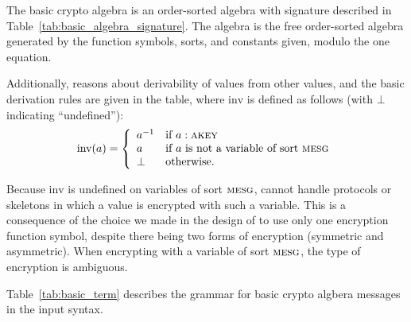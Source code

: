 The basic crypto algebra is an order-sorted algebra with signature
described in Table~\ref{tab:basic_algebra_signature}.  The algebra is
the free order-sorted algebra generated by the function symbols,
sorts, and constants given, modulo the one equation.

Additionally, {\cpsa} reasons about derivability of values from other
values, and the basic derivation rules are given in the table, where
$\mathrm{inv}$ is defined as follows (with $\bot$ indicating
``undefined''):
\begin{equation}
%
\mathrm{inv}(a) = \left\{
%
\begin{array}{ll}
%
a^{-1} & \mbox{if $a : \scap{akey}$}\\
%
a & \mbox{if $a$ is not a variable of sort $\scap{mesg}$} \\
%
\bot & \mbox{otherwise}.
%
\end{array}
%
\right.  %
\end{equation}

Because $\mathrm{inv}$ is undefined on variables of sort
$\scap{mesg}$, {\cpsa} cannot handle protocols or skeletons in which a
value is encrypted with such a variable.  This is a consequence of the
choice we made in the design of {\cpsa} to use only one encryption
function symbol, despite there being two forms of encryption
(symmetric and asymmetric).  When encrypting with a variable of sort
$\scap{mesg}$, the type of encryption is ambiguous.

Table~\ref{tab:basic_term} describes the grammar for basic crypto
algbera messages in the input syntax.

\begin{table}
\caption{{\cpsa} Basic Algebra Syntax; {sorts}, operators \textsc{id}
  from \textsc{Lang} field}\label{tab:basic_term}
\end{table}

